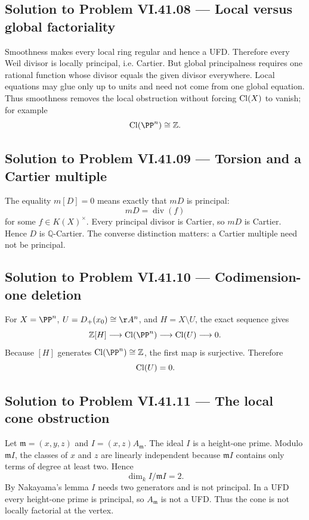 \subsection*{Solution to Problem VI.41.08 — Local versus global factoriality}
\begin{solution}
Smoothness makes every local ring regular and hence a UFD. Therefore every Weil divisor
is locally principal, i.e. Cartier. But global principalness requires one rational
function whose divisor equals the given divisor everywhere. Local equations may glue
only up to units and need not come from one global equation. Thus smoothness removes
the local obstruction without forcing \(\operatorname{Cl}(X)\) to vanish; for example
\[
\Cl(\PP^n)\cong\mathbb Z.
\]
\end{solution}

\subsection*{Solution to Problem VI.41.09 — Torsion and a Cartier multiple}
\begin{solution}
The equality \(m[D]=0\) means exactly that \(mD\) is principal:
\[
mD=\operatorname{div}(f)
\]
for some \(f\in K(X)^\times\). Every principal divisor is Cartier, so \(mD\) is
Cartier. Hence \(D\) is \(\mathbb Q\)-Cartier. The converse distinction matters:
a Cartier multiple need not be principal.
\end{solution}

\subsection*{Solution to Problem VI.41.10 — Codimension-one deletion}
\begin{solution}
For \(X=\PP^n\), \(U=D_+(x_0)\cong\AA^n\), and
\(H=X\setminus U\), the exact sequence gives
\[
\mathbb Z[H]\longrightarrow\Cl(\PP^n)\longrightarrow\Cl(U)\longrightarrow0.
\]
Because \([H]\) generates \(\Cl(\PP^n)\cong\mathbb Z\), the first map is surjective.
Therefore
\[
\operatorname{Cl}(U)=0.
\]
\end{solution}

\subsection*{Solution to Problem VI.41.11 — The local cone obstruction}
\begin{solution}
Let \(\mathfrak m=(x,y,z)\) and
\(I=(x,z)A_{\mathfrak m}\). The ideal \(I\) is a height-one prime. Modulo
\(\mathfrak mI\), the classes of \(x\) and \(z\) are linearly independent because
\(\mathfrak mI\) contains only terms of degree at least two. Hence
\[
\dim_k I/\mathfrak mI=2.
\]
By Nakayama's lemma \(I\) needs two generators and is not principal. In a UFD every
height-one prime is principal, so \(A_{\mathfrak m}\) is not a UFD. Thus the cone is
not locally factorial at the vertex.
\end{solution}

